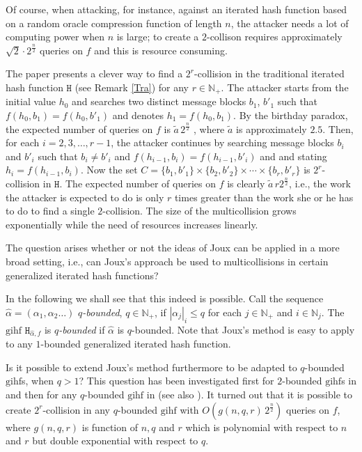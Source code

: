 \documentclass[submission,copyright,creativecommons]{eptcs}
\newcommand{\N}{\mathbb N}
\newcommand{\h}{\mathtt H}
\begin{document}
Of course, when attacking, for instance, against an iterated hash function based on a random oracle compression function of length $n$, the attacker needs a lot of computing power when $n$ is large; to create a $2$-collison requires approximately $\sqrt{2}\cdot 2^{\frac{n}{2}}$ queries on $f$  and this is resource consuming.   

The paper \cite{Jou} presents a clever way to find a $2^r$-collision in the traditional iterated hash function $\h$ (see Remark \ref{Tra}) for any $r\in\N_+$.   
The attacker starts from the initial value $h_0$ and searches two distinct message blocks $b_1$, $b'_1$ such that $f(h_0,b_1)=f(h_0,b'_1)$ and denotes  
$h_1=f(h_0,b_1)$. By the birthday paradox, the expected number of queries on $f$ is $\tilde a\,2^{\frac{n}{2}}$ , where $\tilde a$ is approximately $2.5$.
Then, for each $i=2,3,\ldots,r-1$, the attacker continues by searching message blocks $b_i$ and $b'_i$ such that $b_i\neq b'_i$ and 
$f(h_{i-1},b_i)=f(h_{i-1},b'_i)$ and and stating $h_i=f(h_{i-1},b_i)$. Now the set 
$C=\{b_1,b'_1\}\times\{b_2,b'_2\}\times \cdots \times\{b_r,b'_r\}$ is $2^r$-collision in $\h$. The expected number of queries on $f$ is clearly $\tilde a\,r 2^{\frac{n}{2}}$, i.e., the work the attacker is expected to do is only $r$ times greater than the work she or he has to do to find a single $2$-collision. The size of the multicollision grows exponentially while the need of resources increases linearly.  

The question arises whether or not the ideas of Joux can be applied in a more broad setting, i.e., can Joux's approach be used to multicollisions in certain generalized iterated hash functions? 

In the following we shall see that this indeed is possible. Call the sequence $\hat{\alpha}=(\alpha_1,\alpha_2\ldots)$
$q$\textit{-bounded}, $q\in\N_+$, if $|\alpha_j|_i\leq q$ for each $j\in\N_+$ and $i\in\N_j$. The $\mathrm{gihf}$ $\h_{\hat{\alpha},f}$ is \textit{$q$-bounded} if $\hat\alpha$ is $q$-bounded. Note that Joux's method is easy to apply to any $1$-bounded generalized iterated hash function. 

Is it possible to extend Joux's method furthermore to be adapted to $q$-bounded $\mathrm{gihf}$s, when $q>1$? This question has been investigated first for $2$-bounded $\mathrm{gihf}$s in \cite{NaS} and then for any $q$-bounded $\mathrm{gihf}$ in \cite{HoS} (see also \cite{KHK}). It turned out that it is possible to create $2^r$-collision in any $q$-bounded $\mathrm{gihf}$ with  $O(g(n,q,r)\,2^{\frac{n}{2}})$ queries on $f$, where $g(n,q,r)$ is function of $n,q$ and $r$ which is polynomial with respect to $n$ and $r$ but double exponential with respect to $q$. 
\end{document}
